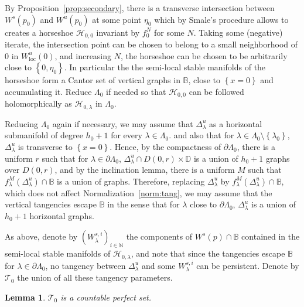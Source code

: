 \documentclass[11pt, oneside]{amsart}
\newcommand{\B}{\mathbb{B}}
\newcommand{\D}{\mathbb{D}}
\newcommand{\N}{\mathbb{N}}
\newcommand{\fr}{\partial}
\newcommand{\set}[1]{\left\{#1\right\}}
\newcommand{\la}{\lambda}
\newcommand{\loc}{{\mathrm{loc}}}
\newtheorem{lem}[prop] {Lemma}
\theoremstyle{remark}
\theoremstyle{definition}
\theoremstyle{theorem}
\begin{document}
By Proposition~\ref{prop:secondary},   there is a 
transverse   intersection between $W^s(p_0)$ and $W^u(p_0)$ at some point $\eta_0$
which by Smale's procedure allows to  creates a horseshoe $\mathcal H_{0,0}$ 
invariant by $f_0^N$ for some $N$. 
Taking some (negative) iterate, the intersection point can be chosen to belong to 
a small neighborhood of 0 in 
 $W^u_\loc(0)$, and increasing $N$,  
the horseshoe can be chosen to be arbitrarily close to 
$\set{0,  \eta_0}$. In particular the 
  the semi-local stable manifolds of the
 horseshoe form a Cantor set of  vertical graphs in  
 $\B$,  close to $\set{x=0}$  and accumulating it. Reduce $\Lambda_0$ if needed so that 
$\mathcal H_{0,0}$  can be followed holomorphically as $\mathcal H_{0, \lambda}$ in $\Lambda_0$. 

Reducing  $\Lambda_0$ again  if necessary, 
  we may assume that   
$\Delta^u_\la$ as a horizontal submanifold of degree $h_0+1$ for every 
$\lambda\in \Lambda_0$.
and also that for $ \la\in \Lambda_0\setminus\set{\lambda_0}$, $\Delta^u_\la$ is transverse to $\set{x=0}$. 
Hence,  by  the  compactness of $\fr\Lambda_0$, 
 there is a  uniform $r$ such that  for $\lambda\in \fr\Lambda_0$,
 $\Delta^u_\lambda\cap D(0,r)\times \D$ is a union 
of $h_0+1$ graphs over $D(0,r)$, and by the inclination lemma, there is a uniform 
$M$ such that $f^M_\lambda (\Delta^u_\lambda)\cap \B$ is a union of graphs. Therefore, 
replacing $\Delta^u_\lambda$ by $f^M_\lambda (\Delta^u_\lambda)\cap \B$, which does not affect 
Normalization~\ref{norm:tang}, 
we may assume that 
 the vertical tangencies escape $\B$ in the sense that for $\lambda$ close to 
 $\fr\Lambda_0$, $\Delta^u_\la$ is a union of $h_0+1$ horizontal graphs. 
 
 As above, denote by $(W^{s,i}_\lambda)_{i\in \N}$
the  components of  $W^s(p)\cap \B$ contained in the semi-local stable manifolds of 
 $\mathcal H_{0,\lambda}$, and note that since the   tangencies escape $\B$ for $\la\in \fr\Lambda_0$, no tangency
 between $\Delta^u_\lambda$ and some $W^{s,i}_\lambda$ can be persistent. Denote by 
 $\mathcal T_0$ the union of all these tangency parameters. 


 
 
 \begin{lem}\label{lem:perfect}
 $\mathcal T_0$ is a countable perfect set. 
 \end{lem}
\end{document}
